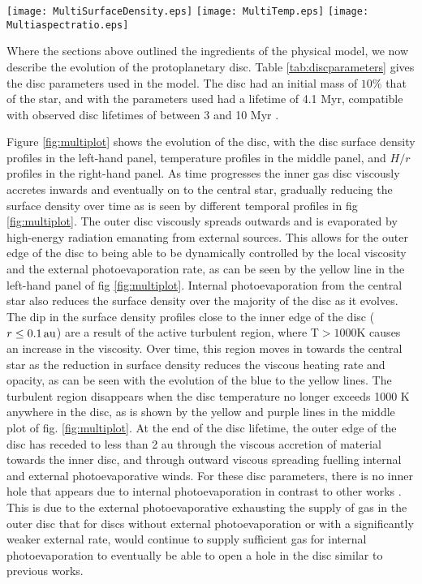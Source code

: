 \documentclass[a4paper,fleqn,usenatbib]{mnras}
\newcommand{\au}{{\, {\rm au}}}
\begin{document}
\begin{figure*}
\centering
\texttt{[image: MultiSurfaceDensity.eps]}
\hspace{0.5cm}
\texttt{[image: MultiTemp.eps]}
\hspace{0.5cm}
\texttt{[image: Multiaspectratio.eps]}
\caption{Gas surface densities, temperatures and aspect ratios after 0.1, 1, 3 and 5 Myr (top-bottom lines) of the fiducial protoplanetary disc.}
\label{fig:multiplot}
\end{figure*}

Where the sections above outlined the ingredients of the physical model, we now describe the evolution of the protoplanetary disc.
Table \ref{tab:discparameters} gives the disc parameters used in the model.
The disc had an initial mass of $10\%$ that of the star, and with the parameters used had a lifetime of 4.1 Myr, compatible with observed disc lifetimes of between 3 and 10 Myr \citep{Mamajek09,Ribas14}.

Figure \ref{fig:multiplot} shows the evolution of the disc, with the disc surface density profiles in the left-hand panel, temperature profiles in the middle panel, and $H/r$ profiles in the right-hand panel.
As time progresses the inner gas disc viscously accretes inwards and eventually on to the central star, gradually reducing the surface density over time as is seen by different temporal profiles in fig \ref{fig:multiplot}.
The outer disc viscously spreads outwards and is evaporated by high-energy radiation emanating from external sources.
This allows for the outer edge of the disc to being able to be dynamically controlled by the local viscosity and the external photoevaporation rate, as can be seen by the yellow line in the left-hand panel of fig \ref{fig:multiplot}.
Internal photoevaporation from the central star also reduces the surface density over the majority of the disc as it evolves.
The dip in the surface density profiles close to the inner edge of the disc ($r\le 0.1\au$) are a result of the active turbulent region, where T$>1000$K causes an increase in the viscosity.
Over time, this region moves in towards the central star as the reduction in surface density reduces the viscous heating rate and opacity, as can be seen with the evolution of the blue to the yellow lines.
The turbulent region disappears when the disc temperature no longer exceeds 1000 K anywhere in the disc, as is shown by the yellow and purple lines in the middle plot of fig. \ref{fig:multiplot}.
At the end of the disc lifetime, the outer edge of the disc has receded to less than 2 au through the viscous accretion of material towards the inner disc, and through outward viscous spreading fuelling internal and external photoevaporative winds.
For these disc parameters, there is no inner hole that appears due to internal photoevaporation in contrast to other works \citep{Alexander07,Gorti15,ColemanNelson16}.
This is due to the external photoevaporative exhausting the supply of gas in the outer disc that for discs without external photoevaporation or with a significantly weaker external rate, would continue to supply sufficient gas for internal photoevaporation to eventually be able to open a hole in the disc similar to previous works.
\end{document}
